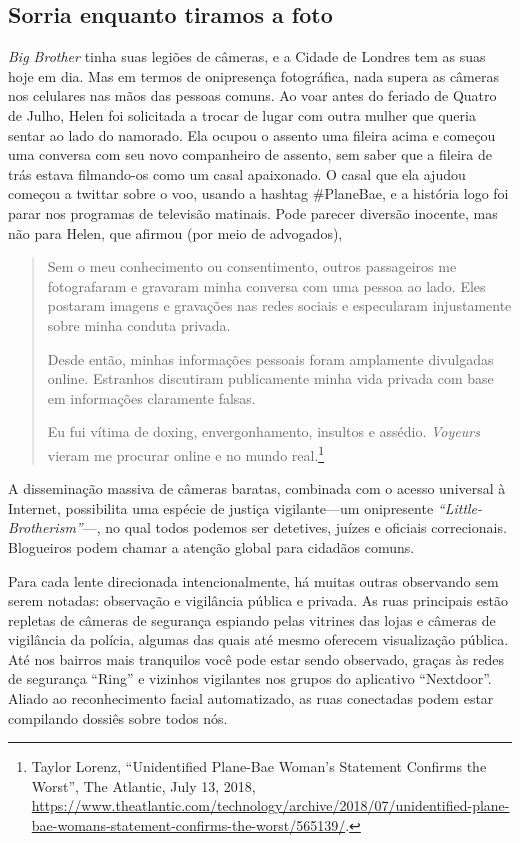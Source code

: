 \documentclass{book}
\newcommand{\ingles}[1]{\textit{#1}}
\begin{document}
\subsection{Sorria enquanto tiramos a foto}
\label{quem:sorria}

\ingles{Big Brother} tinha suas legiões de câmeras, e a Cidade de Londres tem 
as suas hoje em dia. Mas em termos de onipresença fotográfica, nada supera as 
câmeras nos celulares nas mãos das pessoas comuns. Ao voar antes do feriado de 
Quatro de Julho, Helen foi solicitada a trocar de lugar com outra mulher que 
queria sentar ao lado do namorado. Ela ocupou o assento uma fileira acima e começou
uma conversa com seu novo companheiro de assento, sem saber que a fileira de
trás estava filmando-os como um casal apaixonado. O casal que ela ajudou começou
a twittar sobre o voo, usando a hashtag \#PlaneBae, e a história logo foi parar
nos programas de televisão matinais. Pode parecer diversão inocente, mas não para
Helen, que afirmou (por meio de advogados),

\begin{quote}
Sem o meu conhecimento ou consentimento, outros passageiros me fotografaram e
gravaram minha conversa com uma pessoa ao lado. Eles postaram imagens e gravações
nas redes sociais e especularam injustamente sobre minha conduta privada.

Desde então, minhas informações pessoais foram amplamente divulgadas online.
Estranhos discutiram publicamente minha vida privada com base em informações
claramente falsas.

Eu fui vítima de doxing, envergonhamento, insultos e assédio. \ingles{Voyeurs}
vieram me procurar online e no mundo real.\footnote{Taylor Lorenz, ``Unidentified
Plane-Bae Woman’s Statement Confirms the Worst'', The Atlantic, July 13, 2018, 
\url{https://www.theatlantic.com/technology/archive/2018/07/unidentified-plane-bae-womans-statement-confirms-the-worst/565139/}.}
\end{quote}

A disseminação massiva de câmeras baratas, combinada com o acesso universal
à Internet, possibilita uma espécie de justiça vigilante---um onipresente 
\ingles{``Little-Brotherism''}---, no qual todos podemos ser detetives, juízes
e oficiais correcionais. Blogueiros podem chamar a atenção global para cidadãos
comuns.

Para cada lente direcionada intencionalmente, há muitas outras observando sem
serem notadas: observação e vigilância pública e privada. As ruas principais
estão repletas de câmeras de segurança espiando pelas vitrines das lojas e
câmeras de vigilância da polícia, algumas das quais até mesmo oferecem
visualização pública. Até nos bairros mais tranquilos você pode estar sendo
observado, graças às redes de segurança ``Ring'' e vizinhos vigilantes nos
grupos do aplicativo ``Nextdoor''. Aliado ao reconhecimento facial automatizado,
as ruas conectadas podem estar compilando dossiês sobre todos nós.
\end{document}
